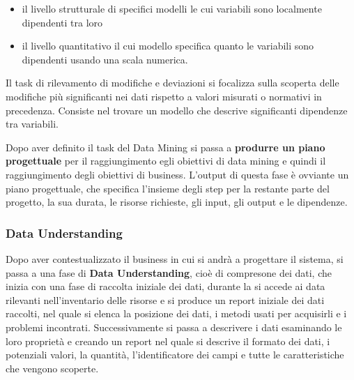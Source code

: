 \documentclass[a4paper]{extarticle}
\begin{document}
\begin{itemize}
\item il livello strutturale di specifici modelli le cui variabili sono localmente dipendenti tra loro
\item il livello quantitativo il cui modello specifica quanto le variabili sono dipendenti usando una scala numerica.
\end{itemize}
Il task di rilevamento di modifiche e deviazioni si focalizza sulla scoperta delle modifiche più significanti nei dati rispetto a valori misurati o normativi in precedenza. Consiste nel trovare un modello che descrive significanti dipendenze tra variabili.

Dopo aver definito il task del Data Mining si passa a \textbf{produrre un piano progettuale} per il raggiungimento egli obiettivi di data mining e quindi il raggiungimento degli obiettivi di business. L'output di questa fase è ovviante un piano progettuale, che specifica l'insieme degli step per la restante parte del progetto, la sua durata, le risorse richieste, gli input, gli output e le dipendenze.

\subsubsection{Data Understanding}

Dopo aver contestualizzato il business in cui si andrà a progettare il sistema, si passa a una fase di \textbf{Data Understanding}, cioè di compresone dei dati, che inizia con una fase di raccolta iniziale dei dati, durante la si accede ai data rilevanti nell'inventario delle risorse e si produce un report iniziale dei dati raccolti, nel quale si elenca la posizione dei dati, i metodi usati per acquisirli e i problemi incontrati. Successivamente si passa a descrivere i dati esaminando le loro proprietà e creando un report nel quale si descrive il formato dei dati, i potenziali valori, la quantità, l'identificatore dei campi e tutte le caratteristiche che vengono scoperte.
\end{document}
